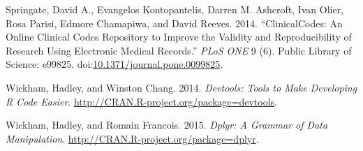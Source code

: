 \documentclass[]{article}
\begin{document}
Springate, David A., Evangelos Kontopantelis, Darren M. Ashcroft, Ivan
Olier, Rosa Parisi, Edmore Chamapiwa, and David Reeves. 2014.
``ClinicalCodes: An Online Clinical Codes Repository to Improve the
Validity and Reproducibility of Research Using Electronic Medical
Records.'' \emph{PLoS ONE} 9 (6). Public Library of Science: e99825.
doi:\href{http://dx.doi.org/10.1371/journal.pone.0099825}{10.1371/journal.pone.0099825}.

Wickham, Hadley, and Winston Chang. 2014. \emph{Devtools: Tools to Make
Developing R Code Easier}.
\url{http://CRAN.R-project.org/package=devtools}.

Wickham, Hadley, and Romain Francois. 2015. \emph{Dplyr: A Grammar of
Data Manipulation}. \url{http://CRAN.R-project.org/package=dplyr}.
\end{document}
